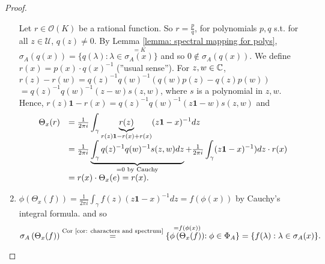\documentclass{article}
\begin{document}
\begin{proof}
\begin{enumerate}[label = (\roman*), align = left]
 Let $r\in \mathcal{O}(K)$ be a rational function. So $r = \frac{p}{q}$, for polynomials $p,q$ s.t. for all $z\in \mathcal{U}$, $q(z)\neq 0$. By Lemma \ref{lemma: spectral mapping for polys}, $\sigma_A(q(x)) = \{q(\lambda): \lambda\in \stackrel{=K}{\sigma_A(x)}\}$ and so $0\not\in\sigma_A(q(x))$. We define $r(x) = p(x)\cdot q(x)^{-1}$ (''usual sense''). For $z,w\in \mathbb{C}$, $r(z)-r(w) = q(z)^{-1}q(w)^{-1}(q(w)p(z)-q(z)p(w))$ $=  q(z)^{-1}q(w)^{-1}(z-w)s(z,w)$, where $s$ is a polynomial in $z,w$. Hence, $r(z)\mathbf{1}-r(x) = q(z)^{-1}q(w)^{-1}(z\mathbf{1}-w)s(z,w)$ and
 $$
 \begin{array}{ll}
     \Theta_x(r) &= \frac{1}{2\pi i}\displaystyle\int_{\gamma}\noindent\underbrace{r(z)}_{r(z)\mathbf{1}-r(x)+r(x)}(z\mathbf{1}-x)^{-1}dz\\
     &= \frac{1}{2\pi i}\noindent\underbrace{\displaystyle\int_{\gamma}q(z)^{-1}q(w)^{-1}s(z,w)dz}_{=0 \text{ by Cauchy}} + \frac{1}{2\pi i}\displaystyle\int_{\gamma}(z\mathbf{1}-x)^{-1})dz\cdot r(x)\\
     &= r(x) \cdot \Theta_x(e) = r(x).
 \end{array}
 $$
 \item $\phi\left(\Theta_x(f)\right) =  \frac{1}{2\pi i}\displaystyle\int_{\gamma}f(z)(z\mathbf{1}-x)^{-1}dz = f(\phi(x))$ by Cauchy's integral formula. and so 
 $$
 \sigma_A\left(\Theta_x(f)\right) \stackrel{\text{Cor \ref{cor: characters and spectrum}}}{=}\{\stackrel{=f(\phi(x))}{\phi\left(\Theta_x(f)\right)}:\phi\in\Phi_A\} =\{f(\lambda):\lambda\in \sigma_A(x)\}.
 $$
 
\end{enumerate}
\end{proof}
\end{document}
